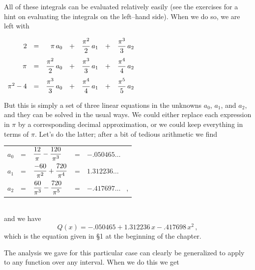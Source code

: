 {{{{All of these integrals 
can be evaluated relatively easily (see the exercises for a hint on evaluating the integrals on the left--hand side).  When we do so, we are left with 

\smallskip
\begin{center}
$\begin{array}{rcrcrcr}
2 &=&\pi\, a_0 &+ &{\displaystyle{{\pi}^2 \over 2}}\, a_1& +& {\displaystyle{{\pi}^3 \over 3}}\,a_2  \\ [.15in]
\pi &=&{\displaystyle{{\pi}^2 \over 2}}\, a_0 &+& {\displaystyle{{\pi}^3 \over 3}}\,a_1 &+& {\displaystyle{{\pi}^4 \over 4}}\,a_2\\ [.15in]
{\pi}^2-4 &=&{\displaystyle{{\pi}^3 \over 3}}\, a_0 &+&{\displaystyle{{\pi}^4 \over 4}}\, a_1 &+ &{\displaystyle{{\pi}^5 \over 5}}\,a_2 
\end{array}$
\end{center}
\smallskip

But this is simply a set of three linear equations in the unknowns $a_0$, $a_1$, and $a_2$, and they can be solved in the usual ways.  We could either replace each expression in $\pi$ by a corresponding decimal approximation, or we could keep everything in terms of $\pi$.  Let's do the latter;  after a bit of tedious arithmetic we find 

\smallskip


\begin{tabular}{rclcl}
$a_0 $&=& ${\displaystyle {12 \over \pi}-{120 \over \pi^3}}$&=& $-.050465\ldots$ \\ [.15in]
$a_1 $&=& ${\displaystyle {-60 \over \pi^2}+{720 \over \pi^4}}$&=& $1.312236\ldots$ \\ [.15in]
$a_2 $&=& ${\displaystyle {60 \over \pi^3}-{720 \over \pi^5}}$&=& $-.417697\ldots$ \, ,\\ [.15in]
\end{tabular}

\\
and we have
\[
Q(x) = -.050465 +1.312236\,x-.417698\,x^2 \, ,
\]
which is the equation given in \S1 at the beginning of the chapter.

The analysis 
we gave for this particular case can clearly be generalized to apply to any function over any interval.  When we do this we get 


}}}}
